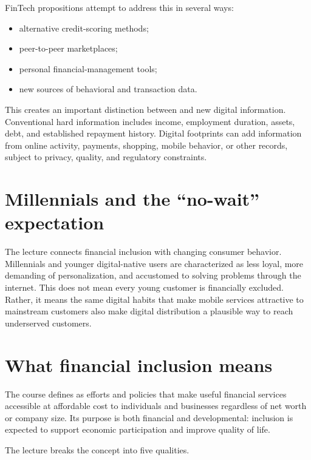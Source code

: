FinTech propositions attempt to address this in several ways:

\begin{itemize}
  \item alternative credit-scoring methods;
  \item peer-to-peer marketplaces;
  \item personal financial-management tools;
  \item new sources of behavioral and transaction data.
\end{itemize}

This creates an important distinction between  and new digital information. Conventional hard information includes income, employment duration, assets, debt, and established repayment history. Digital footprints can add information from online activity, payments, shopping, mobile behavior, or other records, subject to privacy, quality, and regulatory constraints.

\section{Millennials and the ``no-wait'' expectation}

The lecture connects financial inclusion with changing consumer behavior. Millennials and younger digital-native users are characterized as less loyal, more demanding of personalization, and accustomed to solving problems through the internet. This does not mean every young customer is financially excluded. Rather, it means the same digital habits that make mobile services attractive to mainstream customers also make digital distribution a plausible way to reach underserved customers.

\section{What financial inclusion means}

The course defines  as efforts and policies that make useful financial services accessible at affordable cost to individuals and businesses regardless of net worth or company size. Its purpose is both financial and developmental: inclusion is expected to support economic participation and improve quality of life.

The lecture breaks the concept into five qualities.

